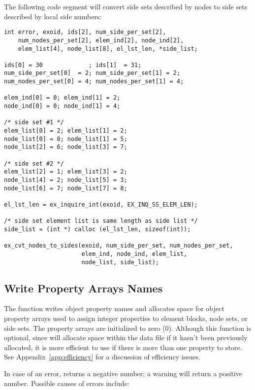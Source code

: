 The following code segment will convert side sets described 
by nodes to side sets described by local side numbers:

\begin{lstlisting}
int error, exoid, ids[2], num_side_per_set[2],
    num_nodes_per_set[2], elem_ind[2], node_ind[2], 
    elem_list[4], node_list[8], el_lst_len, *side_list;

ids[0] = 30             ; ids[1]  = 31;
num_side_per_set[0]  = 2; num_side_per_set[1] = 2;
num_nodes_per_set[0] = 4; num_nodes_per_set[1] = 4;

elem_ind[0] = 0; elem_ind[1] = 2;
node_ind[0] = 0; node_ind[1] = 4;

/* side set #1 */
elem_list[0] = 2; elem_list[1] = 2;
node_list[0] = 8; node_list[1] = 5; 
node_list[2] = 6; node_list[3] = 7;

/* side set #2 */
elem_list[2] = 1; elem_list[3] = 2;
node_list[4] = 2; node_list[5] = 3; 
node_list[6] = 7; node_list[7] = 8;

el_lst_len = ex_inquire_int(exoid, EX_INQ_SS_ELEM_LEN);

/* side set element list is same length as side list */
side_list = (int *) calloc (el_lst_len, sizeof(int));

ex_cvt_nodes_to_sides(exoid, num_side_per_set, num_nodes_per_set,
                      elem_ind, node_ind, elem_list, 
                      node_list, side_list);
\end{lstlisting}



\subsection{Write Property Arrays Names}

The function  writes object property names
and allocates space for object property arrays used to assign integer
properties to element blocks, node sets, or side sets. The property
arrays are initialized to zero (0). Although this function is
optional, since  will allocate space within the
data file if it hasn't been previously allocated, it is more efficient
to use  if there is more than one property
to store. See Appendix~\ref{app:efficiency} for a discussion of
efficiency issues.

In case of an error,  returns a negative
number; a warning will return a positive number.  Possible causes of
errors include:

